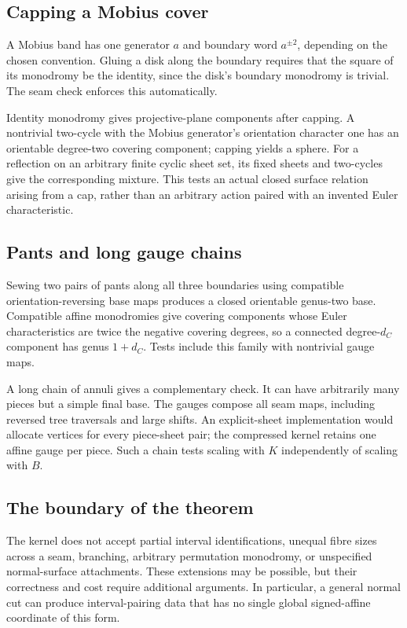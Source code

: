 \documentclass[11pt,a4paper]{article}
\theoremstyle{definition}\newtheorem{definition}[theorem]{Definition}
\theoremstyle{remark}\newtheorem{remark}[theorem]{Remark}
\begin{document}
\subsection{Capping a Mobius cover}

A Mobius band has one generator $a$ and boundary word $a^{\pm2}$, depending
on the chosen convention. Gluing a disk along the boundary requires that
the square of its monodromy be the identity, since the disk's boundary
monodromy is trivial. The seam check enforces this automatically.

Identity monodromy gives projective-plane components after capping. A
nontrivial two-cycle with the Mobius generator's orientation character one
has an orientable degree-two covering component; capping yields a sphere.
For a reflection on an arbitrary finite cyclic sheet set, its fixed sheets
and two-cycles give the corresponding mixture. This tests an actual closed
surface relation arising from a cap, rather than an arbitrary action paired
with an invented Euler characteristic.

\subsection{Pants and long gauge chains}

Sewing two pairs of pants along all three boundaries using compatible
orientation-reversing base maps produces a closed orientable genus-two
base. Compatible affine monodromies give covering components whose Euler
characteristics are twice the negative covering degrees, so a connected
degree-$d_C$ component has genus $1+d_C$. Tests include this family with
nontrivial gauge maps.

A long chain of annuli gives a complementary check. It can have arbitrarily
many pieces but a simple final base. The gauges compose all seam maps,
including reversed tree traversals and large shifts. An explicit-sheet
implementation would allocate vertices for every piece-sheet pair; the
compressed kernel retains one affine gauge per piece. Such a chain tests
scaling with $K$ independently of scaling with $B$.

\subsection{The boundary of the theorem}

The kernel does not accept partial interval identifications, unequal fibre
sizes across a seam, branching, arbitrary permutation monodromy, or
unspecified normal-surface attachments. These extensions may be possible,
but their correctness and cost require additional arguments. In particular,
a general normal cut can produce interval-pairing data that has no single
global signed-affine coordinate of this form.
\end{document}
